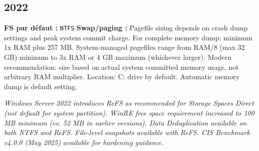 \documentclass[10pt,a4paper]{article}
\begin{document}
\subsection{2022}
\noindent\small \textbf{FS par d\'efaut :} \texttt{NTFS} \quad\textbullet\quad \textbf{Swap/paging :} Pagefile sizing depends on crash dump settings and peak system commit charge. For complete memory dump: minimum 1x RAM plus 257 MB. System-managed pagefiles range from RAM/8 (max 32 GB) minimum to 3x RAM or 4 GB maximum (whichever larger). Modern recommendation: size based on actual system committed memory usage, not arbitrary RAM multiplier. Location: C: drive by default. Automatic memory dump is default setting.\normalsize\par\smallskip
\noindent\small\textit{Windows Server 2022 introduces ReFS as recommended for Storage Spaces Direct (not default for system partition). WinRE free space requirement increased to 100 MB minimum (vs. 52 MB in earlier versions). Data Deduplication available on both NTFS and ReFS. File-level snapshots available with ReFS. CIS Benchmark v4.0.0 (May 2025) available for hardening guidance.}\normalsize\par\smallskip
\end{document}
